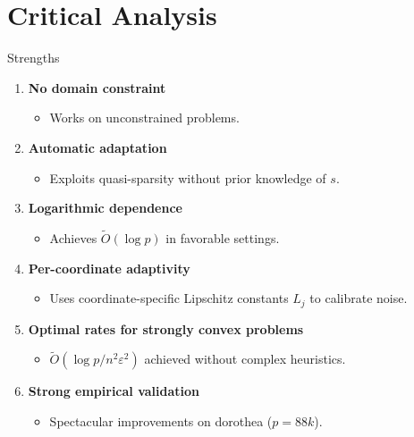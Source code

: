 \documentclass[10pt]{beamer}
\begin{document}
\section{Critical Analysis}

\begin{frame}{Strengths}
\begin{enumerate}
\item \textbf{No domain constraint}
\begin{itemize}
\item Works on unconstrained problems.
\end{itemize}

\item \textbf{Automatic adaptation}
\begin{itemize}
\item Exploits quasi-sparsity without prior knowledge of $s$.
\end{itemize}

\item \textbf{Logarithmic dependence}
\begin{itemize}
\item Achieves $\tilde{O}(\log p)$ in favorable settings.
\end{itemize}

\item \textbf{Per-coordinate adaptivity}
\begin{itemize}
\item Uses coordinate-specific Lipschitz constants $L_j$ to calibrate noise.
\end{itemize}

\item \textbf{Optimal rates for strongly convex problems}
\begin{itemize}
\item $\tilde{O}(\log p / n^2\varepsilon^2)$ achieved without complex heuristics.
\end{itemize}

\item \textbf{Strong empirical validation}
\begin{itemize}
\item Spectacular improvements on dorothea ($p = 88k$).
\end{itemize}
\end{enumerate}
\end{frame}
\end{document}
